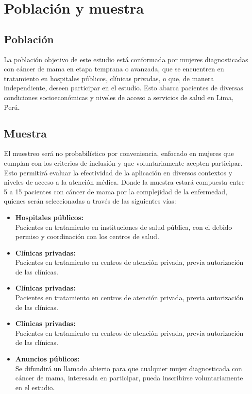 \section{Población y muestra}

\subsection{Población}
La población objetivo de este estudio está conformada por mujeres diagnosticadas con cáncer de mama en etapa temprana o avanzada, que se encuentren en tratamiento en hospitales públicos, clínicas privadas, o que, de manera independiente, deseen participar en el estudio. Esto abarca pacientes de diversas condiciones socioeconómicas y niveles de acceso a servicios de salud en Lima, Perú.
\subsection{Muestra}

El muestreo será no probabilístico por conveniencia, enfocado en mujeres que cumplan con los criterios de inclusión y que voluntariamente acepten participar. Esto permitirá evaluar la efectividad de la aplicación en diversos contextos y niveles de acceso a la atención médica. Donde la muestra estará compuesta entre 5 a 15 pacientes con cáncer de mama por la complejidad de la enfermedad, quienes serán seleccionadas a través de las siguientes vías:

\begin{itemize}
\item \textbf{Hospitales públicos:} \\
Pacientes en tratamiento en instituciones de salud pública, con el debido permiso y coordinación con los centros de salud.
\item \textbf{Clínicas privadas:} \\
Pacientes en tratamiento en centros de atención privada, previa autorización de las clínicas.
\item \textbf{Clínicas privadas:} \\
Pacientes en tratamiento en centros de atención privada, previa autorización de las clínicas.
\item \textbf{Clínicas privadas:} \\
Pacientes en tratamiento en centros de atención privada, previa autorización de las clínicas.
\item \textbf{Anuncios públicos:} \\
Se difundirá un llamado abierto para que cualquier mujer diagnosticada con cáncer de mama, interesada en participar, pueda inscribirse voluntariamente en el estudio.
\end{itemize}

